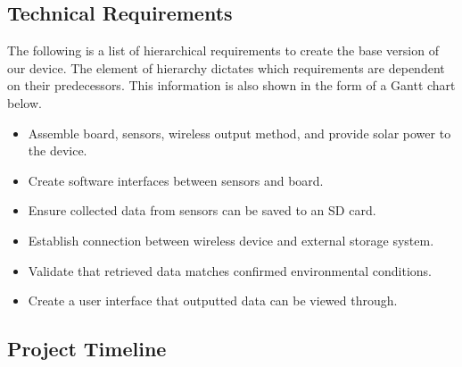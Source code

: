 \documentclass[IEEEtran,letterpaper,10pt,titlepage,fleqn,draftclsnofoot,onecolumn]{article}
\begin{document}
\subsection{Technical Requirements}

The following is a list of hierarchical requirements to create the base version of our device. The element of hierarchy dictates which requirements are dependent on their predecessors. This information is also shown in the form of a Gantt chart below. 

\begin{itemize}
  \item Assemble board, sensors, wireless output method, and provide solar power to the device.
  \item Create software interfaces between sensors and board.
  \item Ensure collected data from sensors can be saved to an SD card.
  \item Establish connection between wireless device and external storage system.
  \item Validate that retrieved data matches confirmed environmental conditions.
  \item Create a user interface that outputted data can be viewed through.
\end{itemize}

\subsection{Project Timeline}
\end{document}
